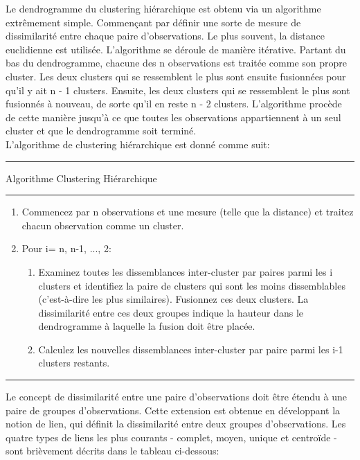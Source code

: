 \documentclass{report}
\begin{document}
Le dendrogramme du clustering hiérarchique est obtenu via un algorithme extrêmement simple. Commençant par définir une sorte de mesure de dissimilarité entre chaque paire d'observations. Le plus souvent, la distance euclidienne est utilisée. L'algorithme se déroule de manière itérative. Partant du bas du dendrogramme, chacune des n observations est traitée comme son propre cluster. Les deux clusters qui se ressemblent le plus sont ensuite fusionnées pour qu'il y ait  n - 1 clusters. Ensuite, les deux clusters qui se ressemblent le plus sont fusionnés à nouveau, de sorte qu'il en reste  n - 2 clusters. L'algorithme procède de cette manière jusqu'à ce que toutes les observations appartiennent à un seul cluster et que le dendrogramme soit terminé.\\
L'algorithme de clustering hiérarchique est donné comme suit:\\
\rule{\linewidth}{.1pt} 
\Large{Algorithme} Clustering Hiérarchique\\
\rule{\linewidth}{.1pt} 
\begin{enumerate}
\item Commencez par n observations et une mesure (telle que la distance) et traitez chacun observation comme un cluster.
\item Pour i= n, n-1, ..., 2: 
\begin{enumerate}
\item Examinez toutes les dissemblances inter-cluster par paires parmi les i clusters et identifiez la paire de clusters qui sont les moins dissemblables (c'est-à-dire les plus similaires). Fusionnez ces deux clusters. La dissimilarité entre ces deux groupes indique la hauteur dans le dendrogramme à laquelle la fusion doit être placée.
\item Calculez les nouvelles dissemblances inter-cluster par paire parmi les i-1 clusters restants.
\end{enumerate}
\end{enumerate}
\rule{\linewidth}{.1pt}
Le concept de dissimilarité entre une paire d'observations doit être étendu à une paire de groupes d'observations. Cette extension est obtenue en développant la notion de lien, qui définit la dissimilarité entre deux groupes d'observations. Les quatre types de liens les plus courants - complet, moyen, unique et centroïde - sont brièvement décrits dans le tableau ci-dessous:\\[0.5cm]
\end{document}
